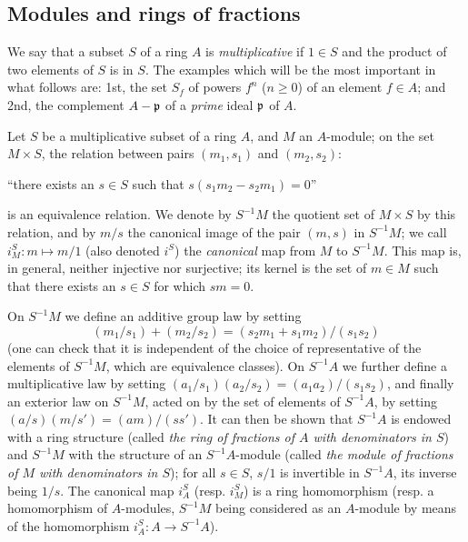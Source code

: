 \subsection{Modules and rings of fractions}
\label{subsection:modules-and-rings-of-fractions}

\begin{env}[1.2.1]
\label{0.1.2.1}
We
say that a subset $S$ of a ring $A$ is \emph{multiplicative} if $1\in S$ and the product of two elements of $S$ is in $S$.
The examples which will be the
most important in what follows are: 1st, the set $S_f$ of
powers $f^n$ ($n\geq 0$) of an element $f\in A$; and 2nd, the
complement $A-\mathfrak{p}$ of a \emph{prime} ideal $\mathfrak{p}$ of $A$.
\end{env}

\begin{env}[1.2.2]
\label{0.1.2.2}
Let $S$ be a multiplicative subset of a ring $A$, and $M$ an $A$-module; on the set
$M\times S$, the relation between pairs $(m_1,s_1)$ and $(m_2,s_2)$:
\begin{center}
  ``there exists an $s\in S$ such that $s(s_1 m_2-s_2 m_1)=0$''
\end{center}
is an equivalence relation. We denote by $S^{-1}M$ the quotient set of
$M\times S$ by this relation, and by $m/s$ the canonical image of the pair $(m,s)$ in $S^{-1}M$; we call $i_M^S:m\mapsto m/1$ (also denoted $i^S$) the
\emph{canonical} map from $M$ to $S^{-1}M$. This map is, in general, neither
injective nor surjective; its kernel is the set of $m\in M$ such that there
exists an $s\in S$ for which $sm=0$.

On $S^{-1}M$ we define an additive group law by setting
\[
  (m_1/s_1)+(m_2/s_2)=(s_2 m_1+s_1 m_2)/(s_1 s_2)
\]
(one can check that it is independent of the choice of representative of the elements of $S^{-1}M$, which are equivalence classes).
On $S^{-1}A$ we further define a multiplicative law by setting
$(a_1/s_1)(a_2/s_2)=(a_1 a_2)/(s_1 s_2)$, and finally an exterior law on
$S^{-1}M$, acted on by the set of elements of $S^{-1}A$, by setting
$(a/s)(m/s')=(am)/(ss')$.
It can then be shown that $S^{-1}A$ is endowed with a
ring structure (called \emph{the ring of fractions of $A$ with denominators in
$S$}) and $S^{-1}M$ with the structure of an $S^{-1}A$-module (called \emph{the
module of fractions of $M$ with denominators in $S$}); for all $s\in S$, $s/1$
is invertible in $S^{-1}A$, its inverse being $1/s$.
The canonical map $i_A^S$ (resp. $i_M^S$) is a ring homomorphism (resp. a homomorphism of $A$-modules,
$S^{-1}M$ being considered as an $A$-module by means of the homomorphism
$i_A^S:A\to S^{-1}A$).
\end{env}

